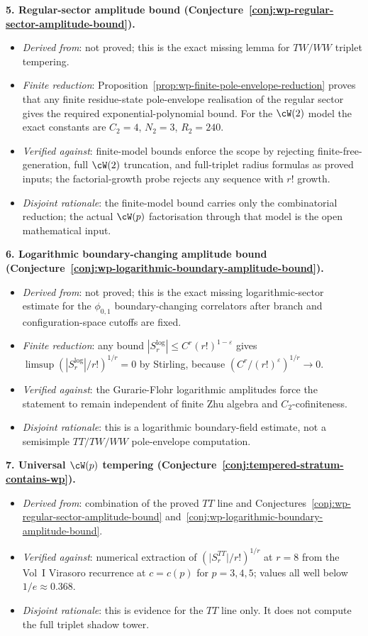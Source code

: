 \textbf{5. Regular-sector amplitude bound
(Conjecture~\ref{conj:wp-regular-sector-amplitude-bound}).}
\begin{itemize}[nosep]
\item \emph{Derived from}: not proved; this is the exact missing
 lemma for $TW/WW$ triplet tempering.
\item \emph{Finite reduction}: Proposition~\ref{prop:wp-finite-pole-envelope-reduction}
 proves that any finite residue-state pole-envelope realisation of
 the regular sector gives the required exponential-polynomial bound.
 For the $\cW(2)$ model the exact constants are
 $C_2=4$, $N_2=3$, $R_2=240$.
\item \emph{Verified against}: finite-model
 bounds enforce the scope by rejecting finite-free-generation, full
 $\cW(2)$ truncation, and full-triplet radius formulas as proved
 inputs; the factorial-growth probe rejects any sequence with $r!$
 growth.
\item \emph{Disjoint rationale}: the finite-model bound carries only
 the combinatorial reduction; the actual $\cW(p)$ factorisation
 through that model is the open mathematical input.
\end{itemize}

\textbf{6. Logarithmic boundary-changing amplitude bound
(Conjecture~\ref{conj:wp-logarithmic-boundary-amplitude-bound}).}
\begin{itemize}[nosep]
\item \emph{Derived from}: not proved; this is the exact missing
 logarithmic-sector estimate for the $\phi_{0,1}$ boundary-changing
 correlators after branch and configuration-space cutoffs are fixed.
\item \emph{Finite reduction}: any bound
 $|S_r^{\log}|\le C^r(r!)^{1-\varepsilon}$ gives
 $\limsup(|S_r^{\log}|/r!)^{1/r}=0$ by Stirling, because
 $(C^r/(r!)^\varepsilon)^{1/r}\to0$.
\item \emph{Verified against}: the Gurarie-Flohr logarithmic amplitudes
 force the statement to remain independent of finite Zhu algebra and
 $C_2$-cofiniteness.
\item \emph{Disjoint rationale}: this is a logarithmic boundary-field
 estimate, not a semisimple $TT/TW/WW$ pole-envelope computation.
\end{itemize}

\textbf{7. Universal $\cW(p)$ tempering
(Conjecture~\ref{conj:tempered-stratum-contains-wp}).}
\begin{itemize}[nosep]
\item \emph{Derived from}: combination of
 the proved $TT$ line and
 Conjectures~\ref{conj:wp-regular-sector-amplitude-bound}
 and~\ref{conj:wp-logarithmic-boundary-amplitude-bound}.
\item \emph{Verified against}: numerical extraction of
 $(\lvert S_r^{TT} \rvert / r!)^{1/r}$ at $r = 8$ from the Vol~I
 Virasoro recurrence at $c = c(p)$ for $p = 3, 4, 5$; values all
 well below $1/e \approx 0.368$.
\item \emph{Disjoint rationale}: this is evidence for the $TT$ line
 only. It does not compute the full triplet shadow tower.
\end{itemize}

